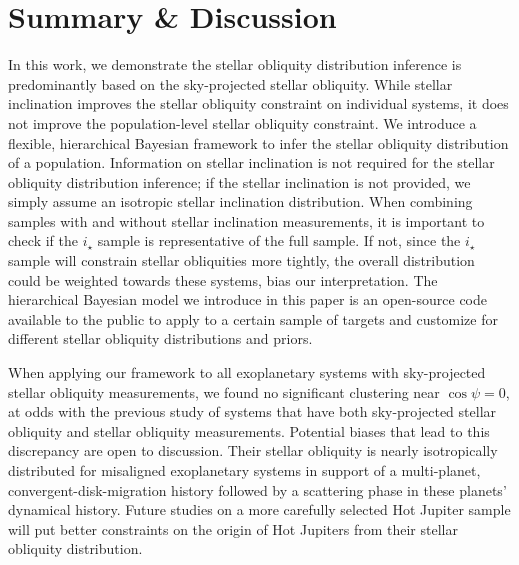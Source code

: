 \documentclass[twocolumn,times]{aastex631}
\begin{document}
\section{Summary \& Discussion}

In this work, we demonstrate the stellar obliquity distribution inference is predominantly based on the sky-projected stellar obliquity. While stellar inclination improves the stellar obliquity constraint on individual systems, it does not improve the population-level stellar obliquity constraint. 
We introduce a flexible, hierarchical Bayesian framework to infer the stellar obliquity distribution of a population. Information on stellar inclination is not required for the stellar obliquity distribution inference; if the stellar inclination is not provided, we simply assume an isotropic stellar inclination distribution. When combining samples with and without stellar inclination measurements, it is important to check if the $i_\star$ sample is representative of the full sample. If not, since the $i_\star$ sample will constrain stellar obliquities more tightly, the overall distribution could be weighted towards these systems, bias our interpretation.
The hierarchical Bayesian model we introduce in this paper is an open-source code available to the public to apply to a certain sample of targets and customize for different stellar obliquity distributions and priors.

When applying our framework to all exoplanetary systems with sky-projected stellar obliquity measurements, we found no significant clustering near $\cos{\psi} = 0$, at odds with the previous study of systems that have both sky-projected stellar obliquity and stellar obliquity measurements. Potential biases that lead to this discrepancy are open to discussion. 
Their stellar obliquity is nearly isotropically distributed for misaligned exoplanetary systems in support of a multi-planet, convergent-disk-migration history followed by a scattering phase in these planets' dynamical history. Future studies on a more carefully selected Hot Jupiter sample will put better constraints on the origin of Hot Jupiters from their stellar obliquity distribution.

\end{document}
